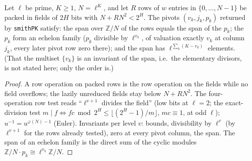 \begin{theorem}\label{thm:lv-smithpk}
  \leanok
  Let $\ell$ be prime, $K\ge1$, $N=\ell^K$, and let $R$ rows of $w$ entries in $\{0,\dots,N-1\}$ be packed in fields of $2H$ bits with
  $N+RN^2<2^H$.  The pivots $(v_k,j_k,p_k)$ returned by \texttt{smithPK} satisfy: the span over $\mathbb Z/N$ of the rows equals the
  span of the $p_k$; the $p_k$ form an echelon family ($p_k$ divisible by $\ell^{v_k}$, of valuation exactly $v_k$ at column $j_k$, every
  later pivot row zero there); and the span has $\ell^{\sum_k(K-v_k)}$ elements.  (That the multiset $\{v_k\}$ is an invariant of the
  span, i.e.\ the elementary divisors, is not stated here; only the order is.)
\end{theorem}
\begin{proof}
  \leanok
  A row operation on packed rows is the row operation on the fields while no field overflows; the lazily unreduced fields stay
  below $N+RN^2$.  The four-operation row test reads ``$\ell^{v+1}$ divides the field'' (low bits at $\ell=2$; the exact-division
  test $m\mid f\iff fc\bmod2^H\le\lfloor(2^H-1)/m\rfloor$, $mc\equiv1$, at odd $\ell$); $u^{-1}=u^{\varphi(N)-1}$ (Euler).  Invariants per
  level $v$: bounds, divisibility by $\ell^v$ (by $\ell^{v+1}$ for the rows already tested), zero at every pivot column, the span.  The
  span of an echelon family is the direct sum of the cyclic modules $\mathbb Z/N\cdot p_k\cong\ell^{v_k}\mathbb Z/N$.
\end{proof}

